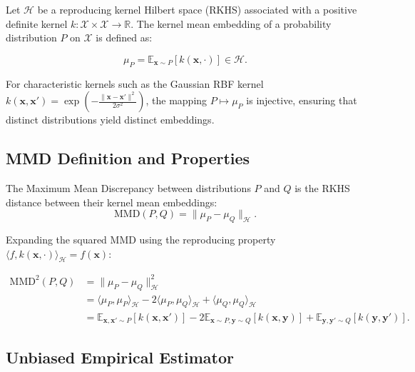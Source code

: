 Let $\mathcal{H}$ be a reproducing kernel Hilbert space (RKHS) associated with a positive definite kernel $k: \mathcal{X} \times \mathcal{X} \rightarrow \mathbb{R}$. The kernel mean embedding of a probability distribution $P$ on $\mathcal{X}$ is defined as:

\begin{equation}
\mu_P = \mathbb{E}_{\mathbf{x} \sim P}\left[k(\mathbf{x}, \cdot)\right] \in \mathcal{H}.
\end{equation}

For characteristic kernels such as the Gaussian RBF kernel $k(\mathbf{x}, \mathbf{x}') = \exp\left(-\frac{\|\mathbf{x} - \mathbf{x}'\|^2}{2\sigma^2}\right)$, the mapping $P \mapsto \mu_P$ is injective, ensuring that distinct distributions yield distinct embeddings.

\subsection{MMD Definition and Properties}

\begin{definition}
The Maximum Mean Discrepancy between distributions $P$ and $Q$ is the RKHS distance between their kernel mean embeddings:
\begin{equation}
\text{MMD}(P, Q) = \|\mu_P - \mu_Q\|_{\mathcal{H}}.
\end{equation}
\end{definition}

Expanding the squared MMD using the reproducing property $\langle f, k(\mathbf{x}, \cdot) \rangle_{\mathcal{H}} = f(\mathbf{x})$:

\begin{align}
\text{MMD}^2(P, Q) &= \|\mu_P - \mu_Q\|_{\mathcal{H}}^2 \\
&= \langle \mu_P, \mu_P \rangle_{\mathcal{H}} - 2\langle \mu_P, \mu_Q \rangle_{\mathcal{H}} + \langle \mu_Q, \mu_Q \rangle_{\mathcal{H}} \\
&= \mathbb{E}_{\mathbf{x}, \mathbf{x}' \sim P}\left[k(\mathbf{x}, \mathbf{x}')\right] - 2\mathbb{E}_{\mathbf{x} \sim P, \mathbf{y} \sim Q}\left[k(\mathbf{x}, \mathbf{y})\right] + \mathbb{E}_{\mathbf{y}, \mathbf{y}' \sim Q}\left[k(\mathbf{y}, \mathbf{y}')\right].
\end{align}

\subsection{Unbiased Empirical Estimator}

